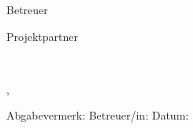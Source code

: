 \begin{titlepage}
{\begin{center}
\vspace{0.5cm}
Betreuer

\mysupervisor



\vfill\vfill\vfill\vfill
Projektpartner

\myprojectpartner\\

\vfill\vfill\vfill\vfill

\mysubmissiontown, \mysubmissionmonth~\mysubmissionyear

\vspace{0.5cm}
\hrulefill

\begin{flushleft}
	

\vfill\vfill
Abgabevermerk:    \hspace{5cm} 					Betreuer/in:
\vfill\vfill
Datum:       
\end{flushleft}
\end{center}
}%
\end{titlepage}